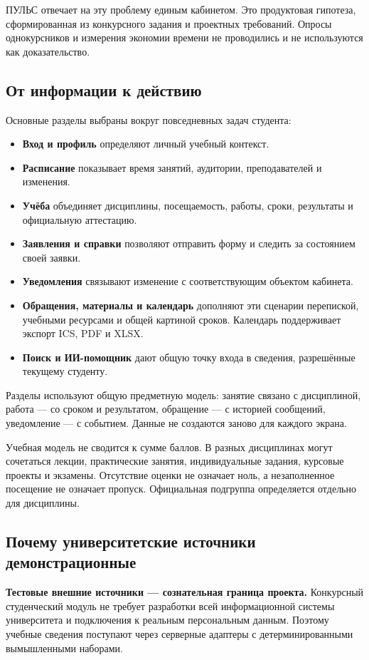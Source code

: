 \documentclass[11pt,a4paper]{article}
\begin{document}
ПУЛЬС отвечает на эту проблему единым кабинетом. Это продуктовая гипотеза, сформированная из конкурсного задания и проектных требований. Опросы однокурсников и измерения экономии времени не проводились и не используются как доказательство.

\subsection{От информации к действию}
Основные разделы выбраны вокруг повседневных задач студента:
\begin{itemize}
\item \textbf{Вход и профиль} определяют личный учебный контекст.
\item \textbf{Расписание} показывает время занятий, аудитории, преподавателей и изменения.
\item \textbf{Учёба} объединяет дисциплины, посещаемость, работы, сроки, результаты и официальную аттестацию.
\item \textbf{Заявления и справки} позволяют отправить форму и следить за состоянием своей заявки.
\item \textbf{Уведомления} связывают изменение с соответствующим объектом кабинета.
\item \textbf{Обращения, материалы и календарь} дополняют эти сценарии перепиской, учебными ресурсами и общей картиной сроков. Календарь поддерживает экспорт ICS, PDF и XLSX.
\item \textbf{Поиск и ИИ-помощник} дают общую точку входа в сведения, разрешённые текущему студенту.
\end{itemize}
Разделы используют общую предметную модель: занятие связано с дисциплиной, работа — со сроком и результатом, обращение — с историей сообщений, уведомление — с событием. Данные не создаются заново для каждого экрана.

Учебная модель не сводится к сумме баллов. В разных дисциплинах могут сочетаться лекции, практические занятия, индивидуальные задания, курсовые проекты и экзамены. Отсутствие оценки не означает ноль, а незаполненное посещение не означает пропуск. Официальная подгруппа определяется отдельно для дисциплины.

\subsection{Почему университетские источники демонстрационные}
\textbf{Тестовые внешние источники — сознательная граница проекта.} Конкурсный студенческий модуль не требует разработки всей информационной системы университета и подключения к реальным персональным данным. Поэтому учебные сведения поступают через серверные адаптеры с детерминированными вымышленными наборами.
\end{document}
